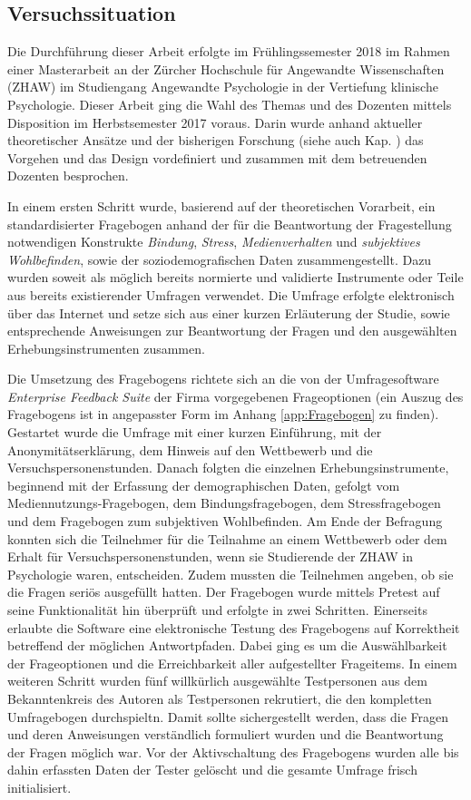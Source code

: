 \subsection{Versuchssituation}\label{sec:Versuchssituation}
Die Durchführung dieser Arbeit erfolgte im Frühlingssemester 2018 im Rahmen einer Masterarbeit an der Zürcher Hochschule für Angewandte Wissenschaften (ZHAW) im Studiengang Angewandte Psychologie in der Vertiefung klinische Psychologie. Dieser Arbeit ging die Wahl des Themas und des Dozenten mittels Disposition im Herbstsemester 2017 voraus. Darin wurde anhand aktueller theoretischer Ansätze und der bisherigen Forschung (siehe auch Kap. ) das Vorgehen und das Design vordefiniert und zusammen mit dem betreuenden Dozenten besprochen. 

In einem ersten Schritt wurde, basierend auf der theoretischen Vorarbeit, ein standardisierter Fragebogen anhand der für die Beantwortung der Fragestellung notwendigen Konstrukte \textit{Bindung}, \textit{Stress}, \textit{Medienverhalten} und \textit{subjektives Wohlbefinden}, sowie der soziodemografischen Daten zusammengestellt. Dazu wurden soweit als möglich bereits normierte und validierte Instrumente oder Teile aus bereits existierender Umfragen verwendet. Die Umfrage erfolgte elektronisch über das Internet und setze sich aus einer kurzen Erläuterung der Studie, sowie entsprechende Anweisungen zur Beantwortung der Fragen und den ausgewählten Erhebungsinstrumenten zusammen. 

Die Umsetzung des Fragebogens richtete sich an die von der Umfragesoftware \textit{Enterprise Feedback Suite} der Firma  vorgegebenen Frageoptionen (ein Auszug des Fragebogens ist in angepasster Form im Anhang \ref{app:Fragebogen} zu finden). Gestartet wurde die Umfrage mit einer kurzen Einführung, mit der Anonymitätserklärung, dem Hinweis auf den Wettbewerb und die Versuchspersonenstunden. Danach folgten die einzelnen Erhebungsinstrumente, beginnend mit der Erfassung der demographischen Daten, gefolgt vom Mediennutzungs-Fragebogen, dem Bindungsfragebogen, dem Stressfragebogen und dem Fragebogen zum subjektiven Wohlbefinden. Am Ende der Befragung konnten sich die Teilnehmer für die Teilnahme an einem Wettbewerb oder dem Erhalt für Versuchspersonenstunden, wenn sie Studierende der ZHAW in Psychologie waren, entscheiden. Zudem mussten die Teilnehmen angeben, ob sie die Fragen seriös ausgefüllt hatten. Der Fragebogen wurde mittels Pretest auf seine Funktionalität hin überprüft und erfolgte in zwei Schritten. Einerseits erlaubte die Software eine elektronische Testung des Fragebogens auf Korrektheit betreffend der möglichen Antwortpfaden. Dabei ging es um die Auswählbarkeit der Frageoptionen und die Erreichbarkeit aller aufgestellter Frageitems. In einem weiteren Schritt wurden fünf willkürlich ausgewählte Testpersonen aus dem Bekanntenkreis des Autoren als Testpersonen rekrutiert, die den kompletten Umfragebogen durchspieltn. Damit sollte sichergestellt werden, dass die Fragen und deren Anweisungen verständlich formuliert wurden und die Beantwortung der Fragen möglich war. Vor der Aktivschaltung des Fragebogens wurden alle bis dahin erfassten Daten der Tester gelöscht und die gesamte Umfrage frisch initialisiert.

